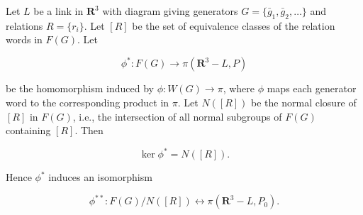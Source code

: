 Let $L$ be a link in $\mathbf{R}^3$ with diagram giving generators $G = \{\bar{g}_1, \bar{g}_2, \ldots\}$ and relations $R = \{r_i\}$. Let $[R]$ be the set of equivalence classes of the relation words in $F(G)$. Let

$$\phi^*: F(G) \rightarrow \pi(\mathbf{R}^3 - L, P)$$

be the homomorphism induced by $\phi: W(G) \rightarrow \pi$, where $\phi$ maps each generator word to the corresponding product in $\pi$. Let $N([R])$ be the normal closure of $[R]$ in $F(G)$, i.e., the intersection of all normal subgroups of $F(G)$ containing $[R]$. Then

$$\ker \phi^* = N([R]).$$

Hence $\phi^*$ induces an isomorphism

$$\phi^{**}: F(G)/N([R]) \leftrightarrow \pi(\mathbf{R}^3 - L, P_0).$$
